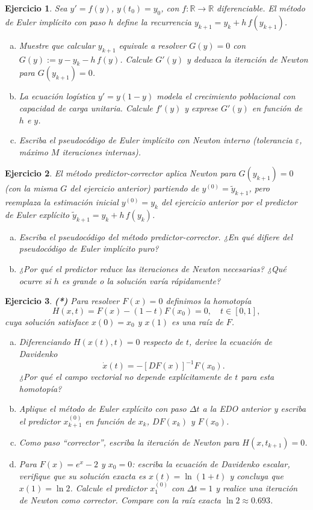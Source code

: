 \documentclass[12pt]{article}
\newtheorem{exercise}{Ejercicio}
\newcommand{\bej}{\begin{exercise}\rm}
\newcommand{\fej}{\end{exercise}}
\begin{document}
\bej
Sea $y'=f(y)$, $y(t_0)=y_0$, con $f:\mathbb{R}\to\mathbb{R}$ diferenciable.
El \emph{método de Euler implícito} con paso $h$ define la recurrencia
$y_{k+1}=y_k+h\,f(y_{k+1})$.
\begin{enumerate}[(a)]
\item Muestre que calcular $y_{k+1}$ equivale a resolver $G(y)=0$ con
$G(y):=y-y_k-h\,f(y)$.
Calcule $G'(y)$ y deduzca la iteración de Newton para $G(y_{k+1})=0$.
\item La \emph{ecuación logística} $y'=y(1-y)$ modela el crecimiento poblacional
con capacidad de carga unitaria.
Calcule $f'(y)$ y exprese $G'(y)$ en función de $h$ e $y$.
\item Escriba el pseudocódigo de Euler implícito con Newton interno 
(tolerancia $\varepsilon$, máximo $M$ iteraciones internas).
\end{enumerate}
\fej

\bej
El \emph{método predictor-corrector} aplica Newton para $G(y_{k+1})=0$ (con la misma $G$ del ejercicio anterior)
partiendo de $y^{(0)}=\tilde{y}_{k+1}$, pero reemplaza la estimación inicial $y^{(0)}=y_k$
del ejercicio anterior por el predictor de Euler explícito
$\tilde{y}_{k+1}=y_k+h\,f(y_k)$.
\begin{enumerate}[(a)]
\item Escriba el pseudocódigo del método predictor-corrector.
¿En qué difiere del pseudocódigo de Euler implícito puro?
\item ¿Por qué el predictor reduce las iteraciones de Newton necesarias?
¿Qué ocurre si $h$ es grande o la solución varía rápidamente?
\end{enumerate}
\fej

\bej\textbf{(*)} Para resolver $F(x)=0$ definimos la homotopía
\[
H(x,t) = F(x)-(1-t)F(x_0)=0, \quad t\in[0,1],
\]
cuya solución satisface $x(0)=x_0$ y $x(1)$ es una raíz de $F$.
\begin{enumerate}[(a)]
\item Diferenciando $H(x(t),t)=0$ respecto de $t$, derive la \emph{ecuación de Davidenko}
\[
\dot{x}(t) = -[DF(x)]^{-1}F(x_0).
\]
¿Por qué el campo vectorial no depende explícitamente de $t$ para esta homotopía?
\item Aplique el método de Euler explícito con paso $\Delta t$ a la EDO anterior y escriba
el predictor $x_{k+1}^{(0)}$ en función de $x_k$, $DF(x_k)$ y $F(x_0)$.
\item Como paso ``corrector'', escriba la iteración de Newton para $H(x,t_{k+1})=0$.
\item Para $F(x)=e^x-2$ y $x_0=0$: escriba la ecuación de Davidenko escalar,
verifique que su solución exacta es $x(t)=\ln(1+t)$ y concluya que $x(1)=\ln 2$.
Calcule el predictor $x_1^{(0)}$ con $\Delta t=1$ y realice una iteración de Newton como corrector.
Compare con la raíz exacta $\ln 2\approx 0.693$.
\end{enumerate}
\fej
\end{document}
